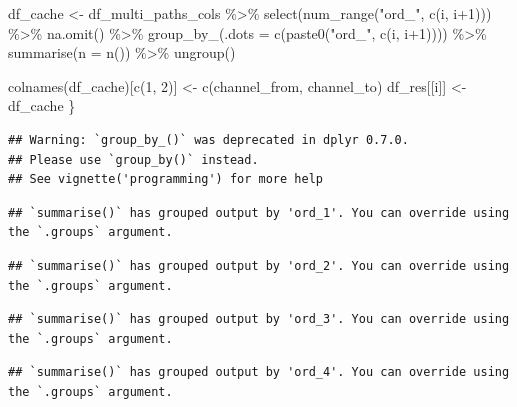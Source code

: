 \documentclass[
]{book}
\newenvironment{Shaded}{\begin{snugshade}}{\end{snugshade}}
\newcommand{\AttributeTok}[1]{\textcolor[rgb]{0.77,0.63,0.00}{#1}}
\newcommand{\DecValTok}[1]{\textcolor[rgb]{0.00,0.00,0.81}{#1}}
\newcommand{\FunctionTok}[1]{\textcolor[rgb]{0.00,0.00,0.00}{#1}}
\newcommand{\NormalTok}[1]{#1}
\newcommand{\OtherTok}[1]{\textcolor[rgb]{0.56,0.35,0.01}{#1}}
\newcommand{\SpecialCharTok}[1]{\textcolor[rgb]{0.00,0.00,0.00}{#1}}
\newcommand{\StringTok}[1]{\textcolor[rgb]{0.31,0.60,0.02}{#1}}
\begin{document}
\begin{Shaded}
\begin{Highlighting}[]
\NormalTok{        df\_cache }\OtherTok{\textless{}{-}}\NormalTok{ df\_multi\_paths\_cols }\SpecialCharTok{\%\textgreater{}\%}
                \FunctionTok{select}\NormalTok{(}\FunctionTok{num\_range}\NormalTok{(}\StringTok{"ord\_"}\NormalTok{, }\FunctionTok{c}\NormalTok{(i, i}\SpecialCharTok{+}\DecValTok{1}\NormalTok{))) }\SpecialCharTok{\%\textgreater{}\%}
                \FunctionTok{na.omit}\NormalTok{() }\SpecialCharTok{\%\textgreater{}\%}
                \FunctionTok{group\_by\_}\NormalTok{(}\AttributeTok{.dots =} \FunctionTok{c}\NormalTok{(}\FunctionTok{paste0}\NormalTok{(}\StringTok{"ord\_"}\NormalTok{, }\FunctionTok{c}\NormalTok{(i, i}\SpecialCharTok{+}\DecValTok{1}\NormalTok{)))) }\SpecialCharTok{\%\textgreater{}\%}
                \FunctionTok{summarise}\NormalTok{(}\AttributeTok{n =} \FunctionTok{n}\NormalTok{()) }\SpecialCharTok{\%\textgreater{}\%}
                \FunctionTok{ungroup}\NormalTok{()}
         
        \FunctionTok{colnames}\NormalTok{(df\_cache)[}\FunctionTok{c}\NormalTok{(}\DecValTok{1}\NormalTok{, }\DecValTok{2}\NormalTok{)] }\OtherTok{\textless{}{-}} \FunctionTok{c}\NormalTok{(}\StringTok{\textquotesingle{}channel\_from\textquotesingle{}}\NormalTok{, }\StringTok{\textquotesingle{}channel\_to\textquotesingle{}}\NormalTok{)}
\NormalTok{        df\_res[[i]] }\OtherTok{\textless{}{-}}\NormalTok{ df\_cache}
\NormalTok{\}}
\end{Highlighting}
\end{Shaded}

\begin{verbatim}
## Warning: `group_by_()` was deprecated in dplyr 0.7.0.
## Please use `group_by()` instead.
## See vignette('programming') for more help
\end{verbatim}

\begin{verbatim}
## `summarise()` has grouped output by 'ord_1'. You can override using the `.groups` argument.
\end{verbatim}

\begin{verbatim}
## `summarise()` has grouped output by 'ord_2'. You can override using the `.groups` argument.
\end{verbatim}

\begin{verbatim}
## `summarise()` has grouped output by 'ord_3'. You can override using the `.groups` argument.
\end{verbatim}

\begin{verbatim}
## `summarise()` has grouped output by 'ord_4'. You can override using the `.groups` argument.
\end{verbatim}
\end{document}
